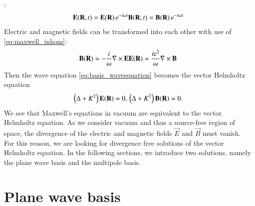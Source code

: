 \cite{bohrenhuffman,jackson, stratton}:
\begin{equation}
{\mathbf{E}}({\mathbf{R}},t) = {\mathbf{E}}({\mathbf{R}}) \, e^{-i\omega t} \\
{\mathbf{B}}({\mathbf{R}},t) = {\mathbf{B}}({\mathbf{R}}) \, e^{-i\omega t}
\end{equation}
Electric and magnetic fields can be transformed into each other with use of
\eqref{eq:maxwell_inhom}:
\begin{equation}
\label{eq:basis_EB2BE}
\vec B(\vec R) = -\frac{\imag}{\omega} \vec \nabla \times \vec E \\
\vec E(\vec R) = \frac{\imag \c^2}{\omega} \vec \nabla \times \vec B
\end{equation}
Then the wave equation \eqref{eq:basis_waveequation} becomes the vector
Helmholtz equation
\begin{equation}
\label{eq:basis_helmholtz}
\left(\Delta + K^2\right) \vec E(\vec R) = 0, \\ \left(\Delta + K^2\right) \vec B(\vec R) = 0.
\end{equation}
We see that Maxwell's equations in vacuum are equivalent to the vector
Helmholtz equation. As we consider vacuum and thus a source-free region of
space, the divergence of the electric and magnetic fields $\vec E$ and $\vec B$
must vanish. For this reason, we are looking for divergence free solutions of
the vector Helmholtz equation. In the following sections, we introduce two
solutions, namely the plane wave basis and the multipole basis.


\section{Plane wave basis}

